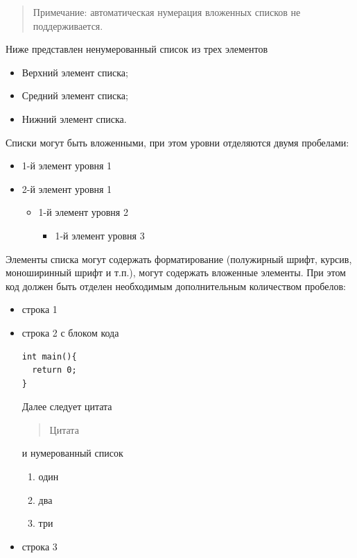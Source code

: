 \documentclass[
  a4paper,
]{book}
\providecommand{\tightlist}{%
  \setlength{\itemsep}{0pt}\setlength{\parskip}{0pt}}
\theoremstyle{definition}
\theoremstyle{definition}
\theoremstyle{definition}
\theoremstyle{definition}
\theoremstyle{remark}
\begin{document}
\begin{quote}
Примечание: автоматическая нумерация вложенных списков не поддерживается.
\end{quote}

Ниже представлен ненумерованный список из трех элементов

\begin{itemize}
\tightlist
\item
  Верхний элемент списка;
\item
  Средний элемент списка;
\item
  Нижний элемент списка.
\end{itemize}

Списки могут быть вложенными, при этом уровни отделяются двумя пробелами:

\begin{itemize}
\tightlist
\item
  1-й элемент уровня 1
\item
  2-й элемент уровня 1

  \begin{itemize}
  \tightlist
  \item
    1-й элемент уровня 2

    \begin{itemize}
    \tightlist
    \item
      1-й элемент уровня 3
    \end{itemize}
  \end{itemize}
\end{itemize}

Элементы списка могут содержать форматирование (полужирный шрифт, курсив, моноширинный шрифт и т.п.), могут содержать вложенные элементы. При этом код должен быть отделен необходимым дополнительным количеством пробелов:

\begin{itemize}
\item
  строка 1
\item
  строка 2 с блоком кода

\begin{verbatim}
int main(){
  return 0;
}
\end{verbatim}

  Далее следует цитата

  \begin{quote}
  Цитата
  \end{quote}

  и нумерованный список

  \begin{enumerate}
  \def\labelenumi{\arabic{enumi}.}
  \tightlist
  \item
    один
  \item
    два
  \item
    три
  \end{enumerate}
\item
  строка 3
\end{itemize}
\end{document}
